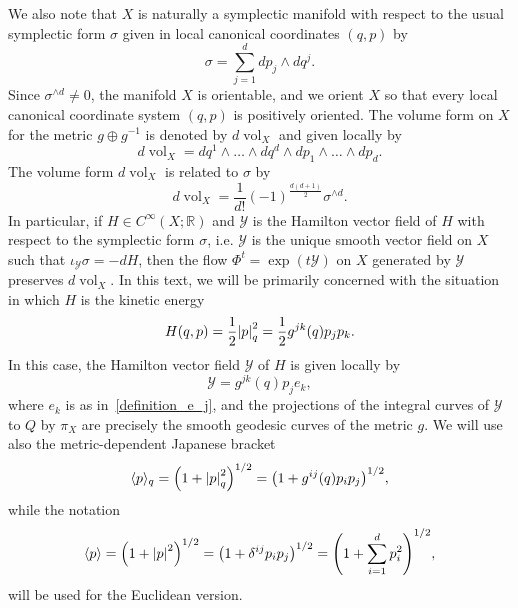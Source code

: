 \documentclass[10pt]{amsart}
\theoremstyle{definition}\newtheorem{defi}[theo]{Definition}\newtheorem{rema}[theo]{Remark}\newtheorem{exam}[theo]{Example}\newtheorem{exem}[theo]{Example}\newtheorem{nota}[theo]{Notation}
\newcommand{\R}{\mathbb{R}}
\newcommand{\clY}{\mathcal{Y}}
\DeclareMathOperator{\voll}{vol}
\newcommand{\abs}[1]{\left| #1 \right|}
\let\originalleft\left
\let\originalright\right
\renewcommand{\left}{\mathopen{}\mathclose\bgroup\originalleft}
\renewcommand{\right}{\aftergroup\egroup\originalright}
\begin{document}
We also note that $X$ is naturally a symplectic manifold with respect to the usual symplectic form $\sigma$ given in local canonical coordinates $(q,p)$ by
\begin{equation}\label{standard_symplectic_form}
\sigma = \sum_{j=1}^d dp_j \wedge dq^j.
\end{equation}
Since $\sigma^{\wedge d} \neq 0$, the manifold $X$ is orientable, and we orient $X$ so that every local canonical coordinate system $(q,p)$ is positively oriented. The volume form on $X$ for the metric $g \oplus g^{-1}$ is denoted by $d\voll_X$ and given locally by
\begin{equation}
d\voll_X = dq^1 \wedge \dots \wedge dq^d \wedge dp_1 \wedge \dots \wedge dp_d.
\end{equation}
The volume form $d\voll_X$ is related to $\sigma$ by
\begin{equation}
d \voll_X = \frac{1}{d!}(-1)^\frac{d(d+1)}{2} \sigma^{\wedge d}.
\end{equation}
In particular, if $H \in C^\infty(X; \R)$ and $\clY$ is the Hamilton vector field of $H$ with respect to the symplectic form $\sigma$, i.e. $\clY$ is the unique smooth vector field on $X$ such that $\iota_{\clY} \sigma = -dH$, then the flow $\Phi^t = \exp{(t\clY)}$ on $X$ generated by $\clY$ preserves $d\voll_X$. In this text, we will be primarily concerned with the situation in which $H$ is the kinetic energy
\begin{equation}\label{kinetic_energy}
H(q,p) = \frac{1}{2} \abs{p}^2_{q} = \frac{1}{2} g^{jk}(q)p_j p_k.
\end{equation}
In this case, the Hamilton vector field $\clY$ of $H$ is given locally by
\begin{equation}
\clY = g^{jk}(q) p_j e_k,
\end{equation}
where $e_k$ is as in~\eqref{definition_e_j}, and the projections of the integral curves of $\clY$ to $Q$ by $\pi_X$ are precisely the smooth geodesic curves of the metric $g$. We will use also the metric-dependent Japanese bracket
\begin{equation}
\langle p \rangle_q = \left(1 + \abs{p}^2_{q}\right)^{1/2}=\left(1+g^{ij}(q)p_i p_j\right)^{1/2},
\end{equation}
while the notation
\begin{equation}
\langle p \rangle = \left(1 + \abs{p}^2\right)^{1/2}=\left(1+\delta^{ij}p_i p_j\right)^{1/2}=\left(1+\sum_{i=1}^{d}p_{i}^{2}\right)^{1/2},
\end{equation}
will be used for the Euclidean version.
\end{document}
